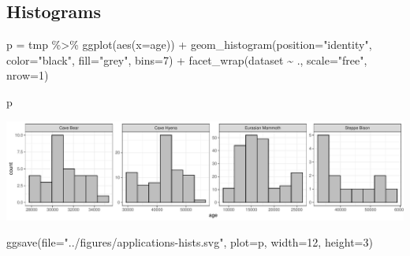 \documentclass[
]{article}
\newenvironment{Shaded}{\begin{snugshade}}{\end{snugshade}}
\newcommand{\AttributeTok}[1]{\textcolor[rgb]{0.77,0.63,0.00}{#1}}
\newcommand{\DecValTok}[1]{\textcolor[rgb]{0.00,0.00,0.81}{#1}}
\newcommand{\FunctionTok}[1]{\textcolor[rgb]{0.00,0.00,0.00}{#1}}
\newcommand{\NormalTok}[1]{#1}
\newcommand{\OtherTok}[1]{\textcolor[rgb]{0.56,0.35,0.01}{#1}}
\newcommand{\SpecialCharTok}[1]{\textcolor[rgb]{0.00,0.00,0.00}{#1}}
\newcommand{\StringTok}[1]{\textcolor[rgb]{0.31,0.60,0.02}{#1}}
\begin{document}
\hypertarget{histograms}{%
\subsection{Histograms}\label{histograms}}

\begin{Shaded}
\begin{Highlighting}[]
\NormalTok{p }\OtherTok{=}\NormalTok{ tmp }\SpecialCharTok{\%\textgreater{}\%} \FunctionTok{ggplot}\NormalTok{(}\FunctionTok{aes}\NormalTok{(}\AttributeTok{x=}\NormalTok{age)) }\SpecialCharTok{+}
  \FunctionTok{geom\_histogram}\NormalTok{(}\AttributeTok{position=}\StringTok{"identity"}\NormalTok{, }\AttributeTok{color=}\StringTok{"black"}\NormalTok{, }\AttributeTok{fill=}\StringTok{"grey"}\NormalTok{, }\AttributeTok{bins=}\DecValTok{7}\NormalTok{) }\SpecialCharTok{+}
  \FunctionTok{facet\_wrap}\NormalTok{(dataset }\SpecialCharTok{\textasciitilde{}}\NormalTok{ ., }\AttributeTok{scale=}\StringTok{"free"}\NormalTok{, }\AttributeTok{nrow=}\DecValTok{1}\NormalTok{)}

\NormalTok{p}
\end{Highlighting}
\end{Shaded}

\includegraphics{applications_files/figure-latex/unnamed-chunk-3-1.pdf}

\begin{Shaded}
\begin{Highlighting}[]
\FunctionTok{ggsave}\NormalTok{(}\AttributeTok{file=}\StringTok{"../figures/applications{-}hists.svg"}\NormalTok{, }\AttributeTok{plot=}\NormalTok{p, }\AttributeTok{width=}\DecValTok{12}\NormalTok{, }\AttributeTok{height=}\DecValTok{3}\NormalTok{)}
\end{Highlighting}
\end{Shaded}
\end{document}
